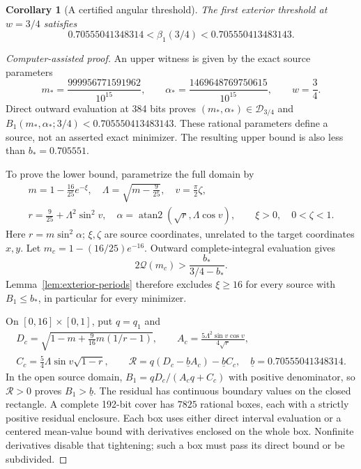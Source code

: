 \documentclass[11pt,a4paper]{article}
\newtheorem{corollary}[theorem]{Corollary}
\theoremstyle{remark}\newtheorem{remark}[theorem]{Remark}
\begin{document}
\begin{corollary}[A certified angular threshold]
\label{cor:angular-threshold-certificate}
The first exterior threshold at $w=3/4$ satisfies
\begin{equation}\label{eq:angular-threshold-certificate}
 0.70555041348314<\beta_1(3/4)<0.705550413483143.
\end{equation}
\end{corollary}
\begin{proof}[Computer-assisted proof]
An upper witness is given by the exact source parameters
\[
 m_* =\frac{999956771591962}{10^{15}},\qquad
 \alpha_* =\frac{1469648769750615}{10^{15}},\qquad w=\frac34.
\]
Direct outward evaluation at 384 bits proves
$(m_*,\alpha_*)\in\mathcal D_{3/4}$ and
$B_1(m_*,\alpha_*;3/4)<0.705550413483143$.
These rational parameters define a source, not an asserted exact
minimizer. The resulting upper bound is also less than $b_*=0.705551$.

To prove the lower bound, parametrize the full domain by
\[
 \begin{gathered}
 m=1-\tfrac{16}{25}e^{-\xi},\quad
 \Lambda=\sqrt{m-\tfrac9{25}},\quad v=\tfrac\pi2\zeta,\\
 r=\tfrac9{25}+\Lambda^2\sin^2v,\quad
 \alpha=\operatorname{atan2}(\sqrt r,\Lambda\cos v),
 \qquad \xi>0,\quad0<\zeta<1.
 \end{gathered}
\]
Here $r=m\sin^2\alpha$; $\xi,\zeta$ are source coordinates,
unrelated to the target coordinates $x,y$.
Let $m_c=1-(16/25)e^{-16}$. Outward complete-integral evaluation gives
\[
 2\mathcal Q(m_c)>\frac{b_*}{3/4-b_*}.
\]
Lemma~\ref{lem:exterior-periods} therefore excludes $\xi\ge16$
for every source with $B_1\le b_*$, in particular for every minimizer.

On $[0,16]\times[0,1]$, put $q=q_1$ and
\[
 \begin{gathered}
 D_c=\sqrt{1-m+\tfrac9{16}m(1/r-1)},\qquad
 A_c=\frac{5\Lambda^2\sin v\cos v}{4\sqrt r},\\
 C_c=\frac54\Lambda\sin v\sqrt{1-r},\qquad
 \mathcal R=q(D_c-\underline b A_c)-\underline b C_c,
 \quad \underline b=0.70555041348314.
 \end{gathered}
\]
In the open source domain, $B_1=qD_c/(A_cq+C_c)$ with positive
denominator, so $\mathcal R>0$ proves $B_1>\underline b$.
The residual has continuous boundary values on the closed rectangle.
A complete 192-bit cover has $7825$ rational boxes, each with a
strictly positive residual enclosure. Each box uses either direct
interval evaluation or a centered mean-value bound with derivatives
enclosed on the whole box. Nonfinite derivatives disable that tightening;
such a box must pass its direct bound or be subdivided.


\end{proof}
\end{document}
